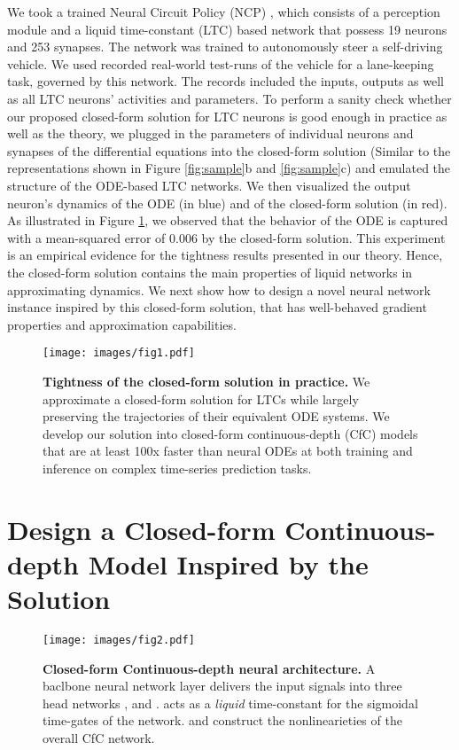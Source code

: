 \documentclass[12pt]{article}
\begin{document}
We took a trained Neural Circuit Policy (NCP)  \cite{lechner2020neural}, which consists of a perception module and a liquid time-constant (LTC) based network  \cite{hasani2021liquid} that possess 19 neurons and 253 synapses. The network was trained to autonomously steer a self-driving vehicle. We used recorded real-world test-runs of the vehicle for a lane-keeping task, governed by this network. The records included the inputs, outputs as well as all
LTC neurons’ activities and parameters. To perform a sanity check whether our proposed closed-form solution for LTC neurons is good enough in practice as well as the theory, we plugged in the parameters of individual neurons and synapses of the differential equations into the closed-form solution (Similar to the representations shown in Figure \ref{fig:sample}b and \ref{fig:sample}c) and emulated the structure of the ODE-based LTC networks. We then visualized the output neuron’s dynamics of the ODE (in blue) and of the closed-form
solution (in red). As illustrated in Figure \ref{fig:intro}, we observed that the behavior of the ODE is captured with a mean-squared error of 0.006 by the closed-form solution. This experiment is an empirical evidence for the tightness results presented in our theory. Hence, the closed-form solution contains the main properties of liquid networks in approximating dynamics. We next show how to design a novel neural network instance inspired by this closed-form solution, that has well-behaved gradient properties and approximation capabilities.



\begin{figure}[t]
	\centering
	\texttt{[image: images/fig1.pdf]}
	\caption{\textbf{Tightness of the closed-form solution in practice.} We approximate a closed-form solution for LTCs \cite{hasani2021liquid} while largely preserving the trajectories of their equivalent ODE systems. We develop our solution into closed-form continuous-depth (CfC) models that are at least 100x faster than neural ODEs at both training and inference on complex time-series prediction tasks.}
	\label{fig:intro}
\end{figure}




\section*{Design a Closed-form Continuous-depth Model Inspired by the Solution}

\begin{figure*}[t]
	\centering
	\texttt{[image: images/fig2.pdf]}
	\caption{\textbf{Closed-form Continuous-depth neural architecture.} A baclbone neural network layer delivers the input signals into three head networks ,  and .  acts as a \emph{liquid} time-constant for the sigmoidal time-gates of the network.  and  construct the nonlinearieties of the overall CfC network.}
	\label{fig:cfc}
\end{figure*}
\end{document}
